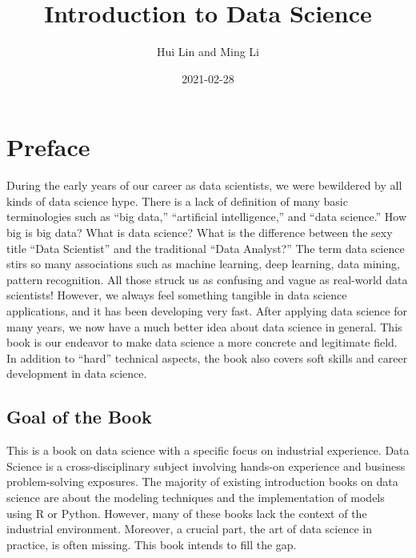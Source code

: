 \documentclass[12pt,]{krantz}
\title{Introduction to Data Science}
\author{Hui Lin and Ming Li}
\date{2021-02-28}
\begin{document}
\maketitle

\thispagestyle{empty}
\begin{center}
\end{center}

\setlength{\abovedisplayskip}{-5pt}
\setlength{\abovedisplayshortskip}{-5pt}

{
\hypersetup{linkcolor=}
\setcounter{tocdepth}{2}
\tableofcontents
}
\listoftables
\listoffigures
\hypertarget{preface}{%
\chapter*{Preface}\label{preface}}


During the early years of our career as data scientists, we were bewildered by all kinds of data science hype. There is a lack of definition of many basic terminologies such as ``big data,'' ``artificial intelligence,'' and ``data science.'' How big is big data? What is data science? What is the difference between the sexy title ``Data Scientist'' and the traditional ``Data Analyst?'' The term data science stirs so many associations such as machine learning, deep learning, data mining, pattern recognition. All those struck us as confusing and vague as real-world data scientists! However, we always feel something tangible in data science applications, and it has been developing very fast. After applying data science for many years, we now have a much better idea about data science in general. This book is our endeavor to make data science a more concrete and legitimate field. In addition to ``hard'' technical aspects, the book also covers soft skills and career development in data science.

\hypertarget{goal-of-the-book}{%
\section*{Goal of the Book}\label{goal-of-the-book}}


This is a book on data science with a specific focus on industrial experience. Data Science is a cross-disciplinary subject involving hands-on experience and business problem-solving exposures. The majority of existing introduction books on data science are about the modeling techniques and the implementation of models using R or Python. However, many of these books lack the context of the industrial environment. Moreover, a crucial part, the art of data science in practice, is often missing. This book intends to fill the gap.
\end{document}
